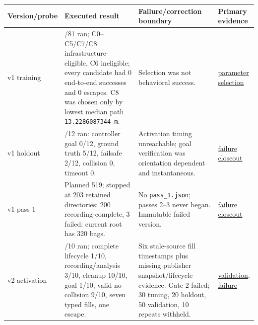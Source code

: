 \documentclass[
  10pt,
  letterpaper,
]{article}
\newcounter{none} %
\begin{document}
{\def\LTcaptype{none} %
\begin{longtable}[]{@{}
  >{\raggedright\arraybackslash}p{}
  >{\raggedright\arraybackslash}p{}
  >{\raggedright\arraybackslash}p{}
  >{\raggedright\arraybackslash}p{}@{}}
\toprule\noalign{}
\begin{minipage}[b]{\linewidth}\raggedright
Version/probe
\end{minipage} & \begin{minipage}[b]{\linewidth}\raggedright
Executed result
\end{minipage} & \begin{minipage}[b]{\linewidth}\raggedright
Failure/correction boundary
\end{minipage} & \begin{minipage}[b]{\linewidth}\raggedright
Primary evidence
\end{minipage} \\
\midrule\noalign{}
\endhead
\bottomrule\noalign{}
\endlastfoot
v1 training & 81/81 ran; C0--C5/C7/C8 infrastructure-eligible, C6 ineligible; every candidate had 0 end-to-end successes and 0 escapes. C8 was chosen only by lowest median path \texttt{13.2286087344 m}. & Selection was not behavioral success. & \href{validation/phase_08_parameter_selection.json}{parameter selection} \\
v1 holdout & 12/12 ran: controller goal 0/12, ground truth 5/12, failsafe 2/12, collision 0, timeout 0. & Activation timing unreachable; goal verification was orientation dependent and instantaneous. & \href{validation/phase_08_v1_failure_closeout.md}{failure closeout} \\
v1 pass 1 & Planned 519; stopped at 203 retained directories: 200 recording-complete, 3 failed; current root has 320 bags. & No \nolinkurl{pass\_1.json}; passes 2--3 never began. Immutable failed version. & \href{validation/phase_08_v1_failure_closeout.md}{failure closeout} \\
v2 activation & 10/10 ran; complete lifecycle 1/10, recording/analysis 3/10, cleanup 10/10, goal 1/10, valid no-collision 9/10, seven typed fills, one escape. & Six stale-source fill timestamps plus missing publisher snapshot/lifecycle evidence. Gate 2 failed; 30 tuning, 20 holdout, 50 validation, 10 repeats withheld. & \href{validation/phase_08_v2_validation_report.md}{validation}, \href{validation/phase_08_v2_failure_report.md}{failure} \\

\end{longtable}}
\end{document}
